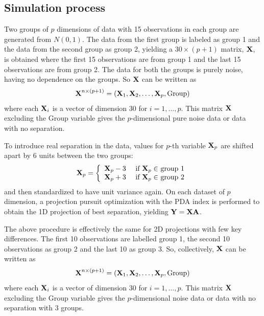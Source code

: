 \subsection{Simulation process}

Two groups of $p$ dimensions of data with 15 observations in each group are generated from $N(0, 1)$.  The data from the first group is labeled as group 1 and the data from the second group as group 2, yielding a $30 \times (p + 1)$ matrix, ${\mbox{\boldmath {\bf X}}}$, is obtained where the first 15 observations are from group 1 and the last 15 observations are from group 2. The data for both the groups is purely noise, having no dependence on the groups. So ${\mbox{\boldmath {\bf X}}}$ can be written as
$${\mbox{\boldmath {\bf X}}}^{n \times (p + 1)} = ({\mbox{\boldmath {\bf X}}}_1, {\mbox{\boldmath {\bf X}}}_2, \dots, {\mbox{\boldmath {\bf X}}}_p, \hbox{Group})$$ where each ${\mbox{\boldmath {\bf X}}}_i$ is a vector of dimension 30 for $i = 1, \dots, p$. This matrix ${\mbox{\boldmath {\bf X}}}$ excluding the Group variable gives the $p$-dimensional pure noise data or data with no separation.

To introduce real separation in the data, values for $p$-th variable ${\mbox{\boldmath {\bf X}}}_p$ are shifted apart by 6 units between the two groups: 
$$
{\mbox{\boldmath {\bf X}}}_p = \left\{ \begin{array}{rl}
 {\mbox{\boldmath {\bf X}}}_p - 3 &\mbox{ if $ {\mbox{\boldmath {\bf X}}}_p \in$ group 1} \\
 {\mbox{\boldmath {\bf X}}}_p + 3 &\mbox{ if $ {\mbox{\boldmath {\bf X}}}_p \in$ group 2}
       \end{array} \right.
$$
and then standardized to have unit variance again. %
On each dataset of $p$ dimension, a projection pursuit optimization with the PDA index is performed to obtain the 1D projection of best separation, yielding $\mbox{\boldmath {\bf Y}} = \mbox{\boldmath {\bf X}} \mbox{\boldmath {\bf A}}$.  

The above procedure is effectively the same for 2D projections with few key differences. The first 10 observations are labelled group 1, the second 10 observations as group 2 and the last 10 as group 3.  So, collectively,  ${\mbox{\boldmath {\bf X}}}$ can be written as
$$ {\mbox{\boldmath {\bf X}}}^{n \times (p + 1)} = ( {\mbox{\boldmath {\bf X}}}_1,  {\mbox{\boldmath {\bf X}}}_2, \dots, {\mbox{\boldmath {\bf X}}}_p, \hbox{Group})$$ where each $ {\mbox{\boldmath {\bf X}}}_i$ is a vector of dimension 30 for $i = 1, \dots, p$. This matrix ${\mbox{\boldmath {\bf X}}}$ excluding the Group variable gives the $p$-dimensional noise data or data with no separation with 3 groups.

